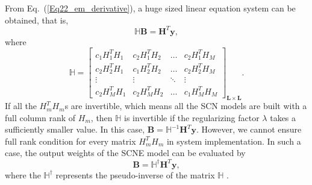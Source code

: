 \documentclass{article}
\begin{document}
From Eq.~(\ref{Eq22_em_derivative}), a huge sized linear equation system can be obtained, that is,
\begin{equation}\label{Eq25_HB_HY}
\mathbb{H}\bm{B} = \bm{H}^T\bm{y}, 
\end{equation}
where 
\begin{equation}\label{Eq26_HHLL}
\mathbb{H} = 
\left[
\begin{array}{cccc}
c_1H_1^TH_1 & c_2H_1^TH_2 & \ldots & c_2H_1^TH_M \\
c_2H_2^TH_1 & c_1H_2^TH_2 & \ldots & c_2H_2^TH_M \\
\vdots & \vdots & \ddots & \vdots \\
c_2H_M^TH_1 & c_2H_M^TH_2 & \ldots & c_1H_M^TH_M
\end{array}
\right]_{\bm{L} \times \bm{L}}.
\end{equation}
If all the $H_m^TH_m$s are invertible, which means all the SCN models are built with a full column rank of $H_m$, then $\mathbb{H}$ is invertible if the regularizing factor $\lambda$ takes a sufficiently smaller value. In this case, $\bm{B}=\mathbb{H}^{-1}\bm{H}^T\bm{y}$.
However, we cannot ensure full rank condition for every matrix $H_m^TH_m$ in system implementation. 
In such a case, the output weights of the SCNE model can be evaluated by
\begin{equation}
\label{Eq27_B_HHY}
\bm{B}=\mathbb{H}^{\dagger}\bm{H}^T\bm{y},
\end{equation}
where the $\mathbb{H}^{\dagger}$ represents the pseudo-inverse of the matrix $\mathbb{H}$ \cite{golub1996Matrix}.\\
\end{document}
